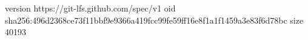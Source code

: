 version https://git-lfs.github.com/spec/v1
oid sha256:496d2368ce73f11bbf9e9366a419fcc99fe59ff16e8f1a1f1459a3e83f6d78bc
size 40193

